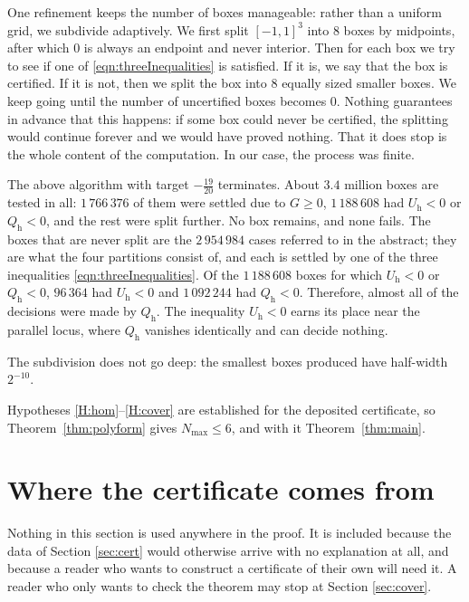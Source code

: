 \documentclass[reqno]{amsart}
\theoremstyle{definition}
\begin{document}
One refinement keeps the number of boxes manageable: rather than a uniform grid, we subdivide adaptively.
We first split $[-1,1]^3$ into $8$ boxes by midpoints, after which $0$ is always an endpoint
and never interior. Then for each box we try to see if one of \eqref{eqn:threeInequalities} is satisfied. If it is, we say that the box is certified. If it is not, then we split the box into 8 equally sized smaller boxes. We keep going until the number of uncertified boxes becomes $0$. Nothing guarantees in advance that this happens: if some box could never be certified, the splitting would continue forever and we would have proved nothing. That it does stop is the whole content of the computation. In our case, the process was finite.

The above algorithm with target $-\tfrac{19}{20}$ terminates. About
$3.4$ million boxes are tested in all: $1\,766\,376$ of them were settled due to $G\geq 0$, $1\,188\,608$ had $U_{\mathrm h}<0$  or $Q_{\mathrm h}<0$, and the rest were split further. No box remains, and none fails. The boxes that are
never split are the $2\,954\,984$ cases referred to in the abstract; they are what the four
partitions consist of, and each is settled by one of the three inequalities
\eqref{eqn:threeInequalities}. Of the $1\,188\,608$ boxes for which $U_{\mathrm h}<0$  or $Q_{\mathrm h}<0$, $96\,364$ had 
$U_{\mathrm h}<0$ and $1\,092\,244$ had $Q_{\mathrm h}<0$. Therefore, almost all of the decisions were made
by $Q_{\mathrm h}$. The inequality $U_{\mathrm h}<0$ earns its place near the parallel locus, where 
$Q_{\mathrm h}$ vanishes identically and can decide nothing.


The subdivision does not go deep: the smallest boxes produced have half-width $2^{-10}$.  

Hypotheses 
\ref{H:hom}--\ref{H:cover} are established for the deposited certificate, so Theorem~\ref{thm:polyform} gives 
$N_{\max}\leq6$, and with it Theorem~\ref{thm:main}.


\section{Where the certificate comes from}\label{sec:motivation}

Nothing in this section is used anywhere in the proof. It is included because the data of
Section \ref{sec:cert} would otherwise arrive with no explanation at all, and because a reader who wants
to construct a certificate of their own will need it. A reader who only wants to check the theorem
may stop at Section \ref{sec:cover}.
\end{document}
